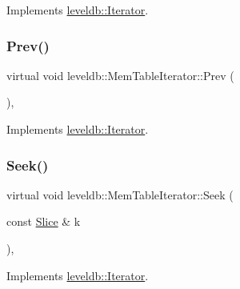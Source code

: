 Implements \mbox{\hyperlink{classleveldb_1_1_iterator_aea54a5ca7eb942eb15770820529410e7}{leveldb\+::\+Iterator}}.

\mbox{\label{classleveldb_1_1_mem_table_iterator_a61f8a385b268158a1e7bd0cba29a83c1}} 
\subsubsection{\texorpdfstring{Prev()}{Prev()}}
{\footnotesize\ttfamily virtual void leveldb\+::\+Mem\+Table\+Iterator\+::\+Prev (\begin{DoxyParamCaption}{ }\end{DoxyParamCaption})\hspace{0.3cm}{\ttfamily [inline]}, {\ttfamily [virtual]}}



Implements \mbox{\hyperlink{classleveldb_1_1_iterator_a28798d802a203788587dc6adc5bc729e}{leveldb\+::\+Iterator}}.

\mbox{\label{classleveldb_1_1_mem_table_iterator_a140f9575286994337de9b49ea7fe62cb}} 
\subsubsection{\texorpdfstring{Seek()}{Seek()}}
{\footnotesize\ttfamily virtual void leveldb\+::\+Mem\+Table\+Iterator\+::\+Seek (\begin{DoxyParamCaption}\item[{const \mbox{\hyperlink{classleveldb_1_1_slice}{Slice}} \&}]{k }\end{DoxyParamCaption})\hspace{0.3cm}{\ttfamily [inline]}, {\ttfamily [virtual]}}



Implements \mbox{\hyperlink{classleveldb_1_1_iterator_a97a556e97ded60c677fbf4de7321ec44}{leveldb\+::\+Iterator}}.

\mbox{\label{classleveldb_1_1_mem_table_iterator_a72eaf5c1bcb6d513f71d4edcb8db3f98}} 
